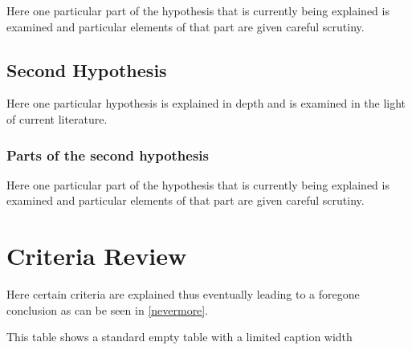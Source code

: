 Here one particular part of the hypothesis that is
currently being explained is examined and particular
elements of that part are given careful scrutiny.


\subsection{Second Hypothesis}

Here one particular hypothesis is explained in depth
and is examined in the light of current literature.

\subsubsection{Parts of the second hypothesis}

Here one particular part of the hypothesis that is
currently being explained is examined and particular
elements of that part are given careful scrutiny.

\section{Criteria Review}

Here certain criteria are explained thus eventually
leading to a foregone conclusion as can be seen in
\autoref{nevermore}.

\begin{table}[h!tb] \centering
    \captionsetup{width=2in}
    \caption{This table shows a standard empty table with a limited caption width}
    \label{nevermore}

    \vspace{ 2 in}
\end{table}
